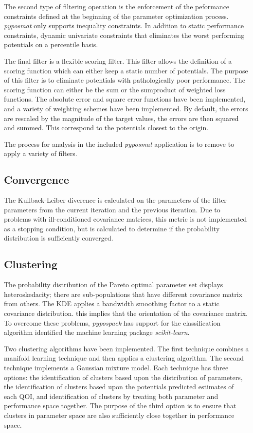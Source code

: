 The second type of filtering operation is the enforcement of the peformance constraints defined at the beginning of the parameter optimization process.  \emph{pyposmat} only supports inequality constraints.  In addition to static performance constraints, dynamic univariate constraints that eliminates the worst performing potentials on a percentile basis.

The final filter is a flexible scoring filter.  This filter allows the definition of a scoring function which can either keep a static number of potentials.  The purpose of this filter is to eliminate potentials with pathologically poor performance.  The scoring function can either be the sum or the sumproduct of weighted loss functions.  The absolute error and square error functions have been implemented, and a variety of weighting schemes have been implemented.  By default, the errors are rescaled by the magnitude of the target values, the errors are then squared and summed.  This correspond to the potentials closest to the origin.

The process for analysis in the included \emph{pyposmat} application is to remove to apply a variety of filters.

\subsection{Convergence}

The Kullback-Leiber diverence is calculated on the parameters of the filter parameters from the current iteration and the previous iteration.  Due to problems with ill-conditioned covariance matrices, this metric is not implemented as a stopping condition, but is calculated to determine if the probability distribution is sufficiently converged.

\subsection{Clustering}

The probability distribution of the Pareto optimal parameter set displays heteroskedacity; there are sub-populations that have different covariance matrix from others.  The KDE applies a bandwidth smoothing factor to a static covariance distribution. this implies that the orientation of the covariance matrix.  To overcome these problems, \emph{pypospack} has support for the classification algorithm identified the machine learning package \emph{scikit-learn}.

Two clustering algorithms have been implemented.  The first technique combines a manifold learning technique and then applies a clustering algorithm.  The second technique implements a Gaussian mixture model.  Each technique has three options: the identification of  clusters based upon the distribution of parameters, the identification of clusters based upon the potentials predicted estimates of each QOI, and identification of clusters by treating both parameter and performance space together.  The purpose of the third option is to ensure that clusters in parameter space are also sufficiently close together in performance space.

